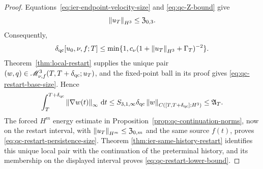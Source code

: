 \begin{proof}
Equations~\eqref{eq:ier-endpoint-velocity-size} and
\eqref{eq:qc-Z-bound} give
\[
 \left\lVert u_T\right\rVert_{H^3}\le\mathfrak Z_{0,3}.
\]
Consequently,
\[
 \delta_{\rm qc}[u_0,\nu,f;T]
 \le\min\{1,c_\nu(1+\left\lVert u_T\right\rVert_{H^3}+\Gamma_T)^{-2}\}.
\]
Theorem~\ref{thm:local-restart} supplies the unique pair
\((w,q)\in\mathscr M_{\nu,f}^3(T,T+\delta_{\rm qc};u_T)\), and the fixed-point
ball in its proof gives \eqref{eq:qc-restart-base-size}.  Hence
\[
 \int_T^{T+\delta_{\rm qc}}\left\lVert \nabla w(t)\right\rVert_\infty\,\mathrm d t
 \le S_{3,1,\infty}\delta_{\rm qc}
 \left\lVert w\right\rVert_{C([T,T+\delta_{\rm qc}];H^3)}
 \le\mathfrak A_T.
\]
The forced \(H^m\) energy estimate in
Proposition~\ref{prop:qc-continuation-norms}, now on the restart interval,
with \(\left\lVert u_T\right\rVert_{H^m}\le\mathfrak Z_{0,m}\) and the same source
\(f(t)\), proves
\eqref{eq:qc-restart-persistence-size}.  Theorem
\ref{thm:ier-same-history-restart} identifies this unique local pair with the
continuation of the preterminal history, and its membership on the displayed
interval proves \eqref{eq:qc-restart-lower-bound}.
\end{proof}

